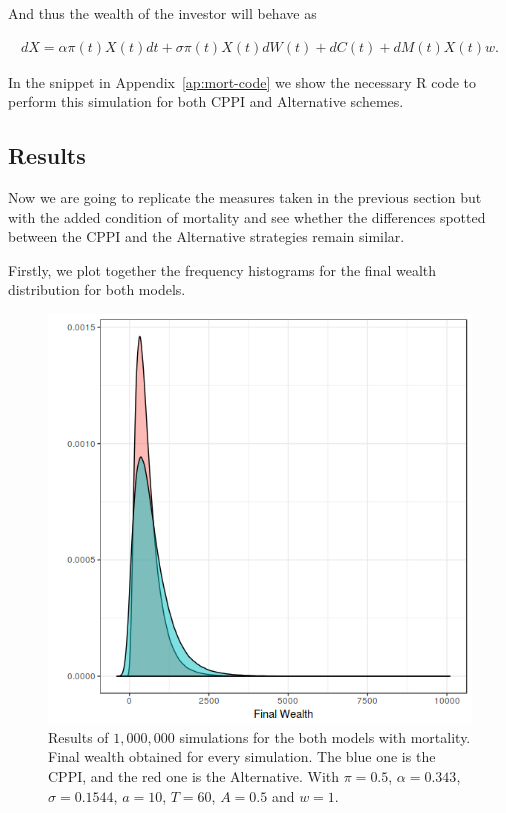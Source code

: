 And thus the wealth of the investor will behave as

\begin{align}
	dX = \alpha \pi(t)X(t)dt + \sigma \pi(t)X(t)dW(t) + dC(t) + dM(t)X(t)w \textit{.}
\end{align}

In the snippet in Appendix~\ref{ap:mort-code} we show the necessary R code to perform this simulation for both CPPI and Alternative schemes.

\subsection{Results}

Now we are going to replicate the measures taken in the previous section but with the added condition of mortality and see whether the differences spotted between the CPPI and the Alternative strategies remain similar.

Firstly, we plot together the frequency histograms for the final wealth distribution for
both models.

\begin{figure}[h]
    \centering
    \includegraphics[scale=0.75]{./images/mort_final_wealth.png}
    \caption{Results of $1,000,000$ simulations for the both models with mortality. Final wealth obtained for every simulation. The blue one is the CPPI, and the red one is the Alternative. With $\pi = 0.5$, $\alpha = 0.343$, $\sigma = 0.1544$, $a = 10$, $T = 60$, $A = 0.5$ and $w = 1$.}
    \label{fig:mort_fw}
\end{figure}


